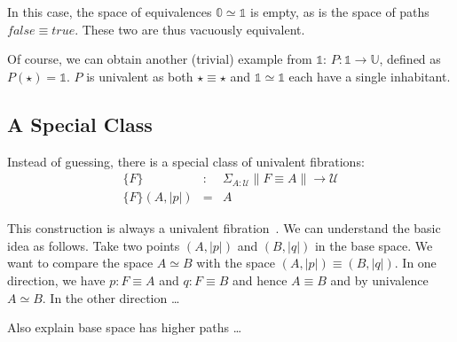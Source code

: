 \documentclass{entcs}
\newcommand{\fc}{\mathit{false}}
\newcommand{\tc}{\mathit{true}}
\begin{document}
\medskip\noindent In this case, the space of equivalences
$\mathbb{0} \simeq \mathbb{1}$ is empty, as is the space of
paths $\fc \equiv \tc$. These two are thus vacuously equivalent.

Of course, we can obtain another (trivial) example from $\mathbb{1}$:
$P : \mathbb{1} \rightarrow \mathbb{U}$, defined as
$P(\star) = \mathbb{1}$. $P$ is univalent as both $\star \equiv \star$ and
$\mathbb{1} \simeq \mathbb{1}$ each have a single inhabitant.

\newpage

\subsection{A Special Class}

Instead of guessing, there is a special class of univalent fibrations:
\[\begin{array}{rcl}
\{F\} &:& \Sigma_{A:\mathcal{U}} \| F \equiv A \| \rightarrow \mathcal{U} \\
\{F\}(A,|p|) &=& A
\end{array}\]

This construction is always a univalent fibration~\cite{XXX}. We can understand
the basic idea as follows. Take two points $(A,|p|)$ and $(B,|q|)$ in the base
space. We want to compare the space $A \simeq B$ with the space
$(A,|p|) \equiv (B,|q|)$.  In one direction, we have $p : F \equiv A$ and
$q : F \equiv B$ and hence $A \equiv B$ and by univalence $A \simeq B$. In the
other direction \ldots

Also explain base space has higher paths \ldots
\end{document}
